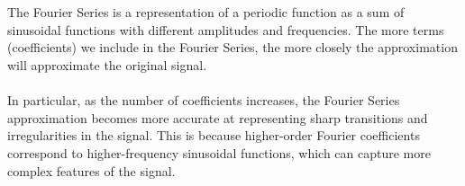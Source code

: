 \documentclass[10pt,a4paper, margin=1in]{article}
\begin{document}
\begin{enumerate}
\\\\The Fourier Series is a representation of a periodic function as a sum of sinusoidal functions with different amplitudes and frequencies. The more terms (coefficients) we include in the Fourier Series, the more closely the approximation will approximate the original signal.
\\\\In particular, as the number of coefficients increases, the Fourier Series approximation becomes more accurate at representing sharp transitions and irregularities in the signal. This is because higher-order Fourier coefficients correspond to higher-frequency sinusoidal functions, which can capture more complex features of the signal.

\end{enumerate}
\end{document}
